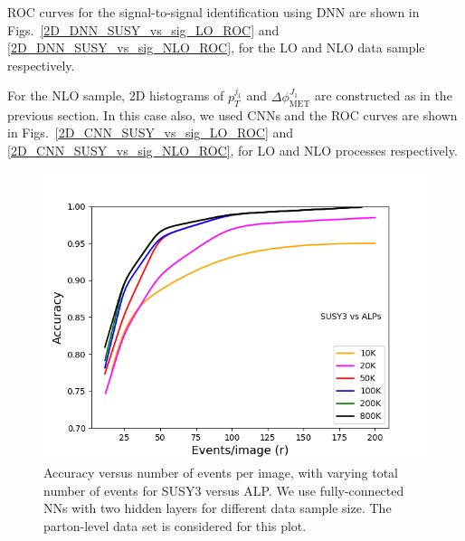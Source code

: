 \documentclass[prd,aps,letterpaper,floatfix,superscriptaddress,preprintnumbers,twocolumn,10pt,nofootinbib]{revtex4-1}
\begin{document}
ROC curves for the signal-to-signal identification using DNN are shown in Figs.~\ref{2D_DNN_SUSY_vs_sig_LO_ROC}  and \ref{2D_DNN_SUSY_vs_sig_NLO_ROC}, for the LO and NLO data sample respectively. 

For the NLO sample, 2D histograms of $p_T^{j_1}$ and $\Delta \phi_{\text{MET}}^{J_1}$ are constructed as in the previous section. In this case also, we used CNNs and the ROC curves are shown in Figs.~\ref{2D_CNN_SUSY_vs_sig_LO_ROC}
and  \ref{2D_CNN_SUSY_vs_sig_NLO_ROC}, for LO and NLO processes respectively.




\begin{figure}%
\centering
\includegraphics[scale=0.50]{figures/accuracyplot2dSUSY3vsAxion.png}
\caption{Accuracy versus number of events per image, with varying total number of events for SUSY3 versus ALP. We  use fully-connected NNs with two hidden layers for different data sample size. The parton-level data set is considered for this plot.} \label{accuracy1}
\end{figure}
\end{document}
